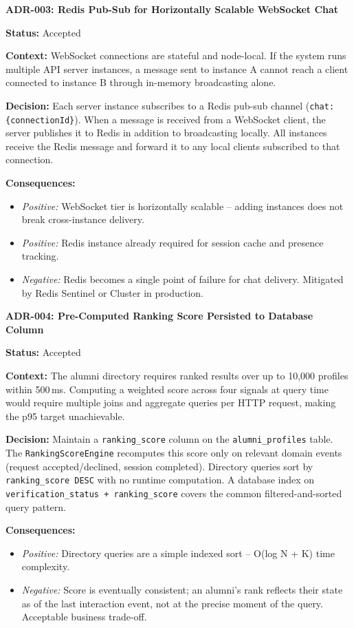 \documentclass[12pt,a4paper]{article}
\begin{document}
\begin{adrbox}
\textbf{ADR-003: Redis Pub-Sub for Horizontally Scalable WebSocket Chat}

\textbf{Status:} Accepted

\textbf{Context:} WebSocket connections are stateful and node-local. If the system runs multiple API server instances, a message sent to instance A cannot reach a client connected to instance B through in-memory broadcasting alone.

\textbf{Decision:} Each server instance subscribes to a Redis pub-sub channel (\texttt{chat:\{connectionId\}}). When a message is received from a WebSocket client, the server publishes it to Redis in addition to broadcasting locally. All instances receive the Redis message and forward it to any local clients subscribed to that connection.

\textbf{Consequences:}
\begin{itemize}[leftmargin=*,topsep=2pt]
  \item \textit{Positive:} WebSocket tier is horizontally scalable -- adding instances does not break cross-instance delivery.
  \item \textit{Positive:} Redis instance already required for session cache and presence tracking.
  \item \textit{Negative:} Redis becomes a single point of failure for chat delivery. Mitigated by Redis Sentinel or Cluster in production.
\end{itemize}
\end{adrbox}

\vspace{0.8em}

\begin{adrbox}
\textbf{ADR-004: Pre-Computed Ranking Score Persisted to Database Column}

\textbf{Status:} Accepted

\textbf{Context:} The alumni directory requires ranked results over up to 10,000 profiles within 500\,ms. Computing a weighted score across four signals at query time would require multiple joins and aggregate queries per HTTP request, making the p95 target unachievable.

\textbf{Decision:} Maintain a \texttt{ranking\_score} column on the \texttt{alumni\_profiles} table. The \texttt{RankingScoreEngine} recomputes this score only on relevant domain events (request accepted/declined, session completed). Directory queries sort by \texttt{ranking\_score DESC} with no runtime computation. A database index on \texttt{verification\_status + ranking\_score} covers the common filtered-and-sorted query pattern.

\textbf{Consequences:}
\begin{itemize}[leftmargin=*,topsep=2pt]
  \item \textit{Positive:} Directory queries are a simple indexed sort -- O(log N + K) time complexity.
  \item \textit{Negative:} Score is eventually consistent; an alumni's rank reflects their state as of the last interaction event, not at the precise moment of the query. Acceptable business trade-off.
\end{itemize}
\end{adrbox}
\end{document}
